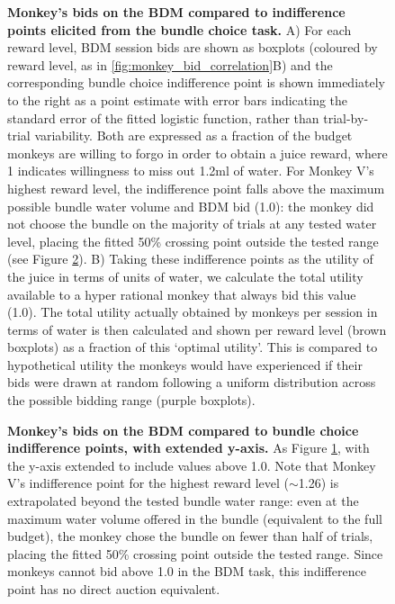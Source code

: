 \begin{figure}[htbp!] 
\centering    

\caption[Monkey's bids on the BDM compared to indifference points elicited from the bundle choice task.]{\textbf{Monkey's bids on the BDM compared to indifference points elicited from the bundle choice task.} A) For each reward level, BDM session bids are shown as boxplots (coloured by reward level, as in \ref{fig:monkey_bid_correlation}B) and the corresponding bundle choice indifference point is shown immediately to the right as a point estimate with error bars indicating the standard error of the fitted logistic function, rather than trial-by-trial variability. Both are expressed as a fraction of the budget monkeys are willing to forgo in order to obtain a juice reward, where 1 indicates willingness to miss out 1.2ml of water. For Monkey V's highest reward level, the indifference point falls above the maximum possible bundle water volume and BDM bid (1.0): the monkey did not choose the bundle on the majority of trials at any tested water level, placing the fitted 50\% crossing point outside the tested range (see Figure \ref{fig:wtp_comparison_extended}). B) Taking these indifference points as the utility of the juice in terms of units of water, we calculate the total utility available to a hyper rational monkey that always bid this value (1.0). The total utility actually obtained by monkeys per session in terms of water is then calculated and shown per reward level (brown boxplots) as a fraction of this ‘optimal utility’. This is compared to hypothetical utility the monkeys would have experienced if their bids were drawn at random following a uniform distribution across the possible bidding range (purple boxplots).}
\label{fig:wtp_comparison}
\end{figure}

\begin{figure}[htbp!]
\centering

\caption[Monkey's bids on the BDM compared to bundle choice indifference points, with extended y-axis.]{\textbf{Monkey's bids on the BDM compared to bundle choice indifference points, with extended y-axis.} As Figure \ref{fig:wtp_comparison}, with the y-axis extended to include values above 1.0. Note that Monkey V's indifference point for the highest reward level ($\sim$1.26) is extrapolated beyond the tested bundle water range: even at the maximum water volume offered in the bundle (equivalent to the full budget), the monkey chose the bundle on fewer than half of trials, placing the fitted 50\% crossing point outside the tested range. Since monkeys cannot bid above 1.0 in the BDM task, this indifference point has no direct auction equivalent.}
\label{fig:wtp_comparison_extended}
\end{figure}

